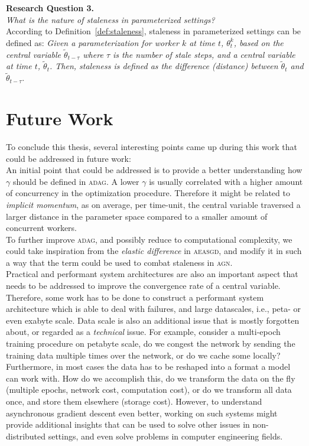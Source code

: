 \noindent \textbf{Research Question 3.}\\
\emph{What is the nature of staleness in parameterized settings?}\\

According to Definition~\ref{def:staleness}, staleness in parameterized settings can be defined as: \emph{Given a parameterization for worker $k$ at time $t$, $\theta^k_t$, based on the central variable $\tilde{\theta}_{t - \tau}$ where $\tau$ is the number of stale steps, and a central variable at time $t$, $\tilde{\theta}_t$. Then, staleness is defined as the difference (distance) between $\tilde{\theta}_t$ and $\tilde{\theta}_{t-\tau}$}.

\section{Future Work}
\label{sec:conclusion_future_work}

To conclude this thesis, several interesting points came up during this work that could be addressed in future work:\\

An initial point that could be addressed is to provide a better understanding how $\gamma$ should be defined in \textsc{adag}. A lower $\gamma$ is usually correlated with a higher amount of concurrency in the optimization procedure. Therefore it might be related to \emph{implicit momentum}, as on average, per time-unit, the central variable traversed a larger distance in the parameter space compared to a smaller amount of concurrent workers.\\

To further improve \textsc{adag}, and possibly reduce to computational complexity, we could take inspiration from the \emph{elastic difference} in \textsc{aeasgd}, and modify it in such a way that the term could be used to combat staleness in \textsc{agn}.\\

Practical and performant system architectures are also an important aspect that needs to be addressed to improve the convergence rate of a central variable. Therefore, some work has to be done to construct a performant system architecture which is able to deal with failures, and large datascales, i.e., peta- or even exabyte scale. Data scale is also an additional issue that is mostly forgotten about, or regarded as a \emph{technical} issue. For example, consider a multi-epoch training procedure on petabyte scale, do we congest the network by sending the training data multiple times over the network, or do we cache some locally? Furthermore, in most cases the data has to be reshaped into a format a model can work with. How do we accomplish this, do we transform the data on the fly (multiple epochs, network cost, computation cost), or do we transform all data once, and store them elsewhere (storage cost). However, to understand asynchronous gradient descent even better, working on such systems might provide additional insights that can be used to solve other issues in non-distributed settings, and even solve problems in computer engineering fields.
